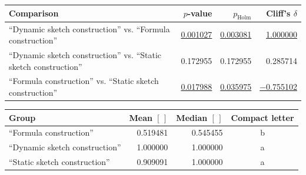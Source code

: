 
\begin{subtable}[t]{\textwidth}
\centering
\caption{Pairwise group comparisons}
\begin{tabular}{lrrr}
\toprule
Comparison & $p$-value & $p_{\mathrm{Holm}}$ & Cliff's $\delta$ \\
\midrule
\enquote{Dynamic sketch construction} vs. \enquote{Formula construction} & \underline{\num{0.001027}} & \underline{\num{0.003081}} & \underline{\num{1.000000}} \\
\enquote{Dynamic sketch construction} vs. \enquote{Static sketch construction} & \num{0.172955} & \num{0.172955} & \num{0.285714} \\
\enquote{Formula construction} vs. \enquote{Static sketch construction} & \underline{\num{0.017988}} & \underline{\num{0.035975}} & \underline{\num{-0.755102}} \\
\bottomrule
\end{tabular}
\end{subtable}

\vspace{0.8em}

\begin{subtable}[t]{\textwidth}
\centering
\caption{Group summaries}
\begin{tabular}{lrrc}
\toprule
Group & Mean $[\,]$ & Median $[\,]$ & Compact letter \\
\midrule
\enquote{Formula construction} & \num{0.519481} & \num{0.545455} & b \\
\enquote{Dynamic sketch construction} & \num{1.000000} & \num{1.000000} & a \\
\enquote{Static sketch construction} & \num{0.909091} & \num{1.000000} & a \\
\bottomrule
\end{tabular}
\end{subtable}
